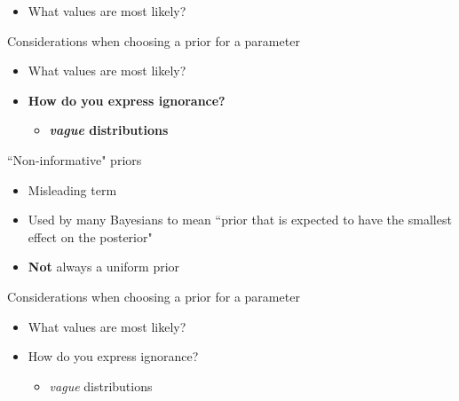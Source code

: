 \documentclass{seminar}
\begin{document}
\begin{slide}
\begin{itemize}
	\item What values are most likely?
\end{itemize}
\newslide
{}
\newslide
\Large	Considerations when choosing a prior for a parameter
\begin{itemize}
	\item What values are most likely?
	\item {\bf How do you express ignorance?}	
		\begin{itemize}
			\item {\bf {\em vague} distributions}
		\end{itemize}
\end{itemize}
\newslide
{}
\newslide
	``Non-informative" priors
\begin{itemize}
	\item Misleading term
	\item Used by many Bayesians to mean ``prior that is expected to have the smallest effect on the posterior" 
	\item {\bf Not} always a uniform prior
\end{itemize}
\newslide
\Large	Considerations when choosing a prior for a parameter
\begin{itemize}
	\item What values are most likely?
	\item How do you express ignorance?	
		\begin{itemize}
			\item {\em vague} distributions

\end{itemize}
\end{itemize}
\end{slide}
\end{document}
